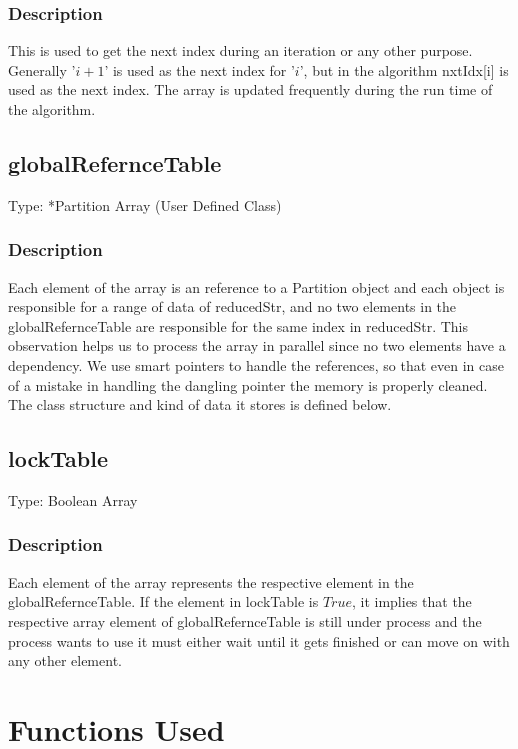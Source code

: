 \documentclass{article}
\begin{document}
\begin{flushleft}
\subsubsection*{Description}
This is used to get the next index during an iteration or any other purpose.
Generally '$i + 1$' is used as the next index for '$i$', but in the algorithm nxtIdx[i] 
is used as the next index. The array is updated frequently during the run time
of the algorithm.

\subsection{globalRefernceTable}

Type: *Partition Array (User Defined Class)

\subsubsection*{Description}
Each element of the array is an reference to a Partition object and each object is responsible for a range of data of reducedStr, and no two elements in the globalRefernceTable are responsible for the same index in  reducedStr. This 
observation helps us to process the array in parallel since no two elements have a dependency. 
\linebreak\linebreak
We use smart pointers to handle the references, so that even in case of a mistake 
in handling the dangling pointer the memory is properly cleaned. The class structure and kind of data it stores is defined below. 

\subsection{lockTable}

Type: Boolean Array

\subsubsection*{Description}
 Each element of the array represents the respective element in the 
globalRefernceTable. If the element in lockTable is $True$, it implies that the respective
array element of globalRefernceTable is still under process and the process wants to use it must either wait until it gets finished or can move on with any other element.

\newpage

\section{Functions Used}


\end{flushleft}
\end{document}
